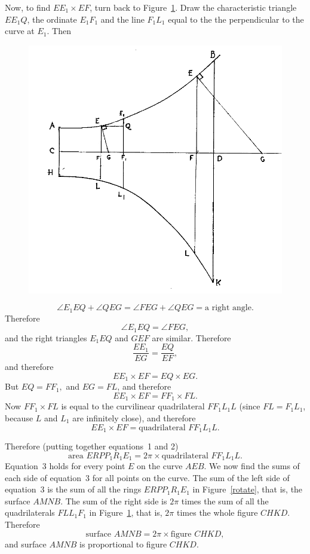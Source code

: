 \documentclass[polutonikogreek,english,twoside,openright]{article}
\begin{document}
Now, to find $EE_1 \times EF$, turn back to Figure~\ref{acurve2}. Draw
the characteristic triangle $EE_1Q$, the ordinate $E_1F_1$ and the
line $F_1L_1$ equal to the the perpendicular to the curve at $E_1$.
Then \addtocounter{figure}{-2}
\begin{figure}[ht]
\begin{center}
\includegraphics[width=\textwidth]{fig/Figure44}
\caption{}
\label{acurve2}
\vspace{-10pt}
\end{center}
\end{figure}
\addtocounter{figure}{1}
$$\angle E_1EQ + \angle QEG  = \angle FEG + \angle QEG = \mbox{a right angle.}$$
Therefore
$$\angle E_1EQ = \angle FEG,$$
and the right triangles $E_1EQ$ and $GEF$ are similar.  Therefore
$$\frac{EE_1}{EG} = \frac{EQ}{EF},$$
and therefore
$$EE_1\times EF = EQ \times EG.$$
But $EQ = FF_1,$ and $EG = FL$, and therefore
$$EE_1\times EF = FF_1 \times FL.$$
Now
$FF_1 \times FL$ is equal to the  curvilinear quadrilateral $FF_1L_1L$
(since $FL = F_1L_1$, because $L$ and $L_1$ are infinitely close), and therefore
\begin{equation}
EE_1\times EF = \mbox{quadrilateral }FF_1L_1L.
\end{equation}


Therefore (putting together equations~1 and 2)
\begin{equation}
\mbox{area }ERPP_1R_1E_1 = 2\pi\times \mbox{quadrilateral }FF_1L_1L.
\end{equation}
Equation~3 holds for every point $E$ on the curve $AEB$. We now find
the sums of each side of equation~3 for all points on the curve.  The
sum of the left side of equation~3 is the sum of all the rings
$ERPP_1R_1E_1$ in Figure~\ref{rotate}, that is, the surface $AMNB$.
The sum of the right side is $2\pi$ times the sum of all the
quadrilaterals $FLL_1F_1$ in Figure~\ref{acurve2}, that is, $2\pi$
times the whole figure $CHKD$.  Therefore
$$\mbox{surface }AMNB = 2\pi\times \mbox{figure }CHKD,$$
and surface $AMNB$ is proportional to figure $CHKD$.
\end{document}

